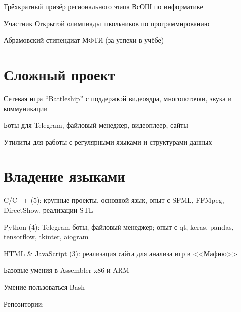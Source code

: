 \resumePOR
{}{Трёхкратный призёр регионального этапа ВсОШ по информатике}{}

\resumePOR
{}{Участник Открытой олимпиады школьников по программированию}{}

\resumePOR
{}{Абрамовский стипендиат МФТИ (за успехи в учёбе)}{}

\resumeSubHeadingListEnd


\section{\textbf{Сложный проект}}
\resumeSubHeadingListStart

\resumePOR
{}{Сетевая игра “Battleship” с поддержкой видеоядра, многопоточки, звука и коммуникации}{}

\resumePOR
{}{Боты для Telegram, файловый менеджер, видеоплеер, сайты}{}

\resumePOR
{}{Утилиты для работы с регулярными языками и структурами данных}{}

\resumeSubHeadingListEnd


\section{\textbf{Владение языками}}
\resumeSubHeadingListStart

\resumePOR
{}{C/C++ (5): крупные проекты, основной язык, опыт с SFML, FFMpeg, DirectShow, реализации STL}{}

\resumePOR
{}{Python (4): Telegram-боты, файловый менеджер; опыт с qt, keras, pandas, tensorflow, tkinter, aiogram}{}

\resumePOR
{}{HTML \& JavaScript (3): реализация сайта для анализа игр в <<Мафию>>}{}

\resumePOR
{}{Базовые умения в Assembler x86 и ARM}{}

\resumePOR
{}{Умение пользоваться Bash}{}

\resumePOR
{}{Репозитории: \href{https://github.com/NTheme}{}}{}

\resumeSubHeadingListEnd
